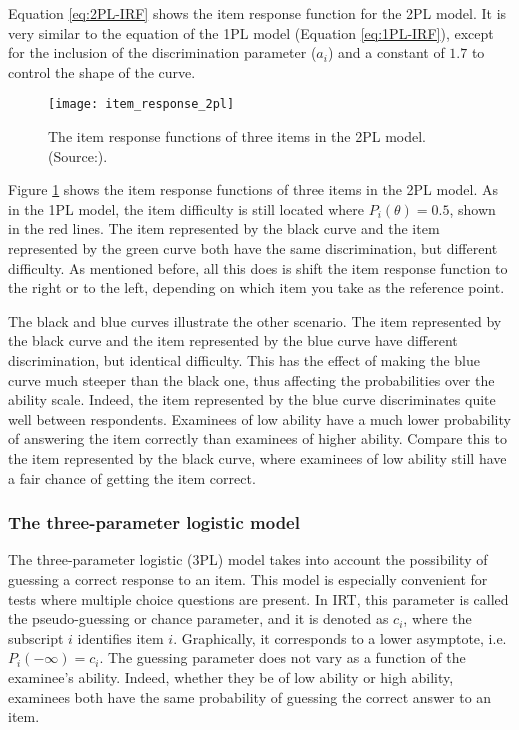 Equation \eqref{eq:2PL-IRF} shows the item response function for the 2PL model. It is very similar to the equation of the 1PL model (Equation \eqref{eq:1PL-IRF}), except for the inclusion of the discrimination parameter ($a_i$) and a constant of $1.7$ to control the shape of the curve.

\begin{figure}[H]
\centering
\texttt{[image: item\_response\_2pl]}
\caption{The item response functions of three items in the 2PL model. (Source:\cite{Visual-IRT}).}
\label{fig:item_response_2pl}
\end{figure}

Figure \ref{fig:item_response_2pl} shows the item response functions of three items in the 2PL model. As in the 1PL model, the item difficulty is still located where $P_i(\theta)=0.5$, shown in the red lines. The item represented by the black curve and the item represented by the green curve both have the same discrimination, but different difficulty. As mentioned before, all this does is shift the item response function to the right or to the left, depending on which item you take as the reference point. \newline

The black and blue curves illustrate the other scenario. The item represented by the black curve and the item represented by the blue curve have different discrimination, but identical difficulty. This has the effect of making the blue curve much steeper than the black one, thus affecting the probabilities over the ability scale. Indeed, the item represented by the blue curve discriminates quite well between respondents. Examinees of low ability have a much lower probability of answering the item correctly than examinees of higher ability. Compare this to the item represented by the black curve, where examinees of low ability still have a fair chance of getting the item correct.

\subsubsection{The three-parameter logistic model}
The three-parameter logistic (3PL) model takes into account the possibility of guessing a correct response to an item. This model is especially convenient for tests where multiple choice questions are present. In IRT, this parameter is called the pseudo-guessing or chance parameter, and it is denoted as $c_i$, where the subscript $i$ identifies item $i$. Graphically, it corresponds to a lower asymptote, i.e. $P_i(-\infty)=c_i$. The guessing parameter does not vary as a function of the examinee's ability. Indeed, whether they be of low ability or high ability, examinees both have the same probability of guessing the correct answer to an item.

